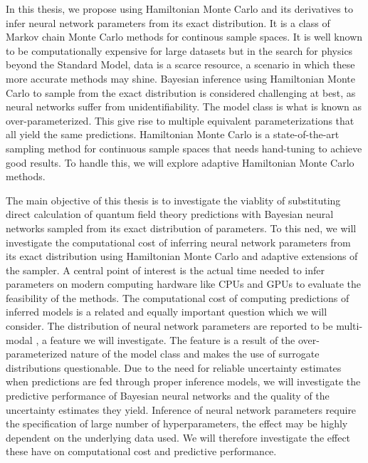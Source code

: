 In this thesis, we propose using Hamiltonian Monte Carlo and its derivatives to infer neural network parameters from its exact distribution. It is a class of Markov chain Monte Carlo methods for continous sample spaces. It is well known to be computationally expensive for large datasets but in the search for physics beyond the Standard Model, data is a scarce resource, a scenario in which these more accurate methods may shine. Bayesian inference using Hamiltonian Monte Carlo to sample from the exact distribution is considered challenging at best, as neural networks suffer from unidentifiability. The model class is what is known as over-parameterized. This give rise to multiple equivalent parameterizations that all yield the same predictions. Hamiltonian Monte Carlo is a state-of-the-art sampling method for continuous sample spaces that needs hand-tuning to achieve good results. To handle this, we will explore adaptive Hamiltonian Monte Carlo methods. 

The main objective of this thesis is to investigate the viablity of substituting direct calculation of quantum field theory predictions with Bayesian neural networks sampled from its exact distribution of parameters.
To this ned, we will investigate the computational cost of inferring neural network parameters from its exact distribution using Hamiltonian Monte Carlo and adaptive extensions of the sampler. A central point of interest is the actual time needed to infer parameters on modern computing hardware like CPUs and GPUs to evaluate the feasibility of the methods. The computational cost of computing predictions of inferred models is a related and equally important question which we will consider. The distribution of neural network parameters are reported to be multi-modal \cite{google_bnn_posteriors}, a feature we will investigate. The feature is a result of the over-parameterized nature of the model class and makes the use of surrogate distributions questionable. Due to the need for reliable uncertainty estimates when predictions are fed through proper inference models, we will investigate the predictive performance of Bayesian neural networks and the quality of the uncertainty estimates they yield. Inference of neural network parameters require the specification of large number of hyperparameters, the effect may be highly dependent on the underlying data used. We will therefore investigate the effect these have on computational cost and predictive performance.


